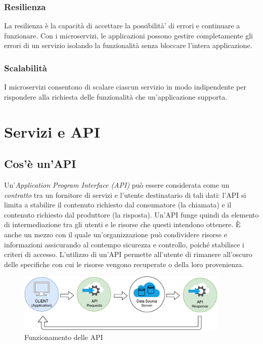 \subsubsection{Resilienza}
La resilienza è la capacità di accettare la possibilità’ di errori e continuare a funzionare. Con i microservizi, le applicazioni possono gestire completamente gli errori di un servizio isolando la funzionalità senza bloccare l’intera applicazione.

\subsubsection{Scalabilità}
I microservizi consentono di scalare ciascun servizio in modo indipendente per rispondere alla richiesta delle funzionalità che un'applicazione supporta. 


\section{Servizi e API}

\subsection{Cos'è un'API}
Un'\textit{Application Program Interface (API)} può essere considerata come un \emph{contratto} tra un fornitore di servizi e l'utente destinatario di tali dati: l'API si limita a stabilire il contenuto richiesto dal consumatore (la chiamata) e il contenuto richiesto dal produttore (la risposta). Un'API funge quindi da elemento di intermediazione tra gli utenti e le risorse che questi intendono ottenere. È anche un mezzo con il quale un'organizzazione può condividere risorse e informazioni assicurando al contempo sicurezza e controllo, poiché stabilisce i criteri di accesso. L'utilizzo di un'API permette all'utente di rimanere all'oscuro delle specifiche con cui le risorse vengono recuperate o della loro provenienza.
\begin{figure}[H]
    \centering
    \includegraphics[width=0.90\textwidth]{images/01_9_api.pdf}
    \caption{Funzionamento delle API}
    \label{fig:api}
\end{figure}

